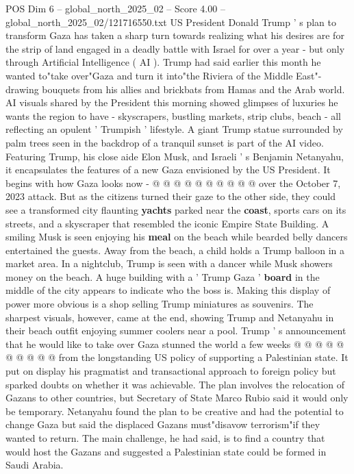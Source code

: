 \begin{textsample}{POS Dim 6 – global\_north\_2025\_02 – Score 4.00 – global\_north\_2025\_02/121716550.txt}  \label{ex:f6_pos_348}
US President Donald Trump ' s plan to transform Gaza has taken a sharp turn towards realizing what his desires are for the strip of land engaged in a deadly battle with Israel for over a year - but only through Artificial Intelligence ( AI ).
Trump had said earlier this month he wanted to"take over"Gaza and turn it into"the Riviera of the Middle East"- drawing bouquets from his allies and brickbats from Hamas and the Arab world.
AI visuals shared by the President this morning showed glimpses of luxuries he wants the region to have - skyscrapers, bustling markets, strip clubs, beach - all reflecting an opulent ' Trumpish ' lifestyle.
A giant Trump statue surrounded by palm trees seen in the backdrop of a tranquil sunset is part of the AI video.
Featuring Trump, his close aide Elon Musk, and Israeli ' s Benjamin Netanyahu, it encapsulates the features of a new Gaza envisioned by the US President.
It begins with how Gaza looks now - @ @ @ @ @ @ @ @ @ @ over the October 7, 2023 attack.
But as the citizens turned their gaze to the other side, they could see a transformed city flaunting \textbf{yachts} parked near the \textbf{coast}, sports cars on its streets, and a skyscraper that resembled the iconic Empire State Building.
A smiling Musk is seen enjoying his \textbf{meal} on the beach while bearded belly dancers entertained the guests.
Away from the beach, a child holds a Trump balloon in a market area.
In a nightclub, Trump is seen with a dancer while Musk showers money on the beach.
A huge building with a ' Trump Gaza ' \textbf{board} in the middle of the city appears to indicate who the boss is.
Making this display of power more obvious is a shop selling Trump miniatures as souvenirs.
The sharpest visuals, however, came at the end, showing Trump and Netanyahu in their beach outfit enjoying summer coolers near a pool.
Trump ' s announcement that he would like to take over Gaza stunned the world a few weeks @ @ @ @ @ @ @ @ @ @ from the longstanding US policy of supporting a Palestinian state.
It put on display his pragmatist and transactional approach to foreign policy but sparked doubts on whether it was achievable.
The plan involves the relocation of Gazans to other countries, but Secretary of State Marco Rubio said it would only be temporary.
Netanyahu found the plan to be creative and had the potential to change Gaza but said the displaced Gazans must"disavow terrorism"if they wanted to return.
The main challenge, he had said, is to find a country that would host the Gazans and suggested a Palestinian state could be formed in Saudi Arabia.

\end{textsample}
